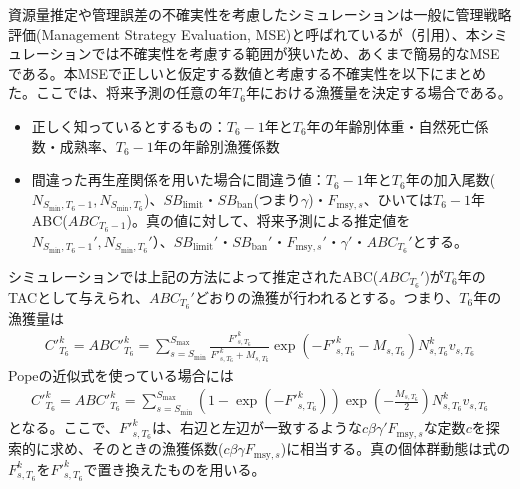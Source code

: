 \documentclass[11pt]{jsarticle}
\begin{document}
資源量推定や管理誤差の不確実性を考慮したシミュレーションは一般に管理戦略評価(Management Strategy Evaluation, MSE)と呼ばれているが（引用）、本シミュレーションでは不確実性を考慮する範囲が狭いため、あくまで簡易的なMSEである。本MSEで正しいと仮定する数値と考慮する不確実性を以下にまとめた。ここでは、将来予測の任意の年$T_6$年における漁獲量を決定する場合である。
\begin{itemize}
\item 正しく知っているとするもの：$T_6-1$年と$T_6$年の年齢別体重・自然死亡係数・成熟率、$T_6-1$年の年齢別漁獲係数
\item 間違った再生産関係を用いた場合に間違う値：$T_6-1$年と$T_6$年の加入尾数($N_{S_{\mathrm{min}},T_6 -1}, N_{S_{\mathrm{min}},T_6}$)、$S\!B_{\mathrm{limit}}$・$S\!B_{\mathrm{ban}}$(つまり$\gamma$)・$F_{\mathrm{msy},s}$、ひいては$T_6-1$年ABC($ABC_{T_6-1}$)。真の値に対して、将来予測による推定値を$N_{S_{\mathrm{min}},T_6-1}', N_{S_{\mathrm{min}},T_6}'$）、$S\!B_{\mathrm{limit}}'$・$S\!B_{\mathrm{ban}}'$・$F_{\mathrm{msy},s}'$・$\gamma'$・$ABC_{T_6}'$とする。
\end{itemize}

シミュレーションでは上記の方法によって推定されたABC($ABC_{T_6}'$)が$T_6$年のTACとして与えられ、$ABC_{T_6}'$どおりの漁獲が行われるとする。つまり、$T_6$年の漁獲量は
\begin{eqnarray}
  {C'}_{T_6}^{k}={ABC'}_{T_6}^{k}=\sum_{s=S_{\mathrm{min}}}^{S_{\mathrm{max}}} \frac{{F'}_{s,T_6}^k}{{F'}_{s,T_6}^k+M_{s,T_6}}
  \exp(- {F'}_{s,T_6}^k - M_{s,T_6}) N_{s,T_6}^k v_{s,T_6}
\label{ABC_eq1}
\end{eqnarray}
Popeの近似式を使っている場合には
\begin{eqnarray}
  {C'}_{T_6}^k={ABC'}_{T_6}^{k}=\sum_{s=S_{\mathrm{min}}}^{S_{\mathrm{max}}} (1-\exp(- {F'}_{s,T_6}^k)) \exp(-\frac{M_{s,T_6}}{2}) N_{s,T_6}^k v_{s,T_6}
\label{ABC_eq2}
\end{eqnarray}
となる。ここで、${F'}_{s,T_6}^k$は、右辺と左辺が一致するような$c \beta \gamma' F_{\mathrm{msy},s}$な定数$c$を探索的に求め、そのときの漁獲係数($c \beta \gamma F_{\mathrm{msy},s}$)に相当する。真の個体群動態は式\label{future_eq3}の$F_{s,T_6}^k$を${F'}_{s,T_6}^k$で置き換えたものを用いる。
\end{document}
